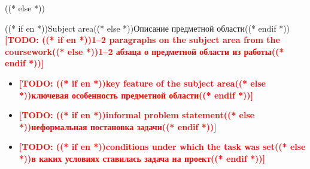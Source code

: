 \documentclass[aspectratio=169, 14pt]{beamer}
\newcommand{\todo}[1]{\textcolor{red}{\textbf{[TODO: #1]}}}
\begin{document}
((* else *))

\begin{frame}{((* if en *))Subject area((* else *))Описание предметной области((* endif *))}
  \todo{((* if en *))1--2 paragraphs on the subject area from the coursework((* else *))1--2 абзаца о предметной области из работы((* endif *))}

  \vspace{0.4em}
  \begin{itemize}
    \item \todo{((* if en *))key feature of the subject area((* else *))ключевая особенность предметной области((* endif *))}
    \item \todo{((* if en *))informal problem statement((* else *))неформальная постановка задачи((* endif *))}
    \item \todo{((* if en *))conditions under which the task was set((* else *))в каких условиях ставилась задача на проект((* endif *))}
  \end{itemize}
\end{frame}
\end{document}
